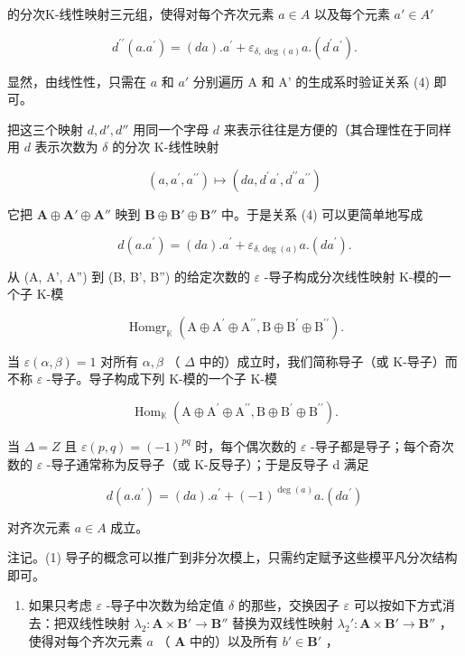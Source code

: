 的分次K-线性映射三元组，使得对每个齐次元素 \(a \in A\) 以及每个元素 \(a' \in A'\)

\[
d ^ {\prime \prime} (a. a ^ {\prime}) = (d a). a ^ {\prime} + \varepsilon_ {\delta , \deg (a)} a. (d ^ {\prime} a ^ {\prime}).\tag{4}
\]

显然，由线性性，只需在 \(a\) 和 \(a'\) 分别遍历 A 和 A' 的生成系时验证关系 (4) 即可。

把这三个映射 \(d, d', d''\) 用同一个字母 \(d\) 来表示往往是方便的（其合理性在于同样用 \(d\) 表示次数为 \(\delta\) 的分次 K-线性映射

\[
(a, a ^ {\prime}, a ^ {\prime \prime}) \mapsto (d a, d ^ {\prime} a ^ {\prime}, d ^ {\prime \prime} a ^ {\prime \prime})
\]

它把 \(\mathbf{A} \oplus \mathbf{A}' \oplus \mathbf{A}''\) 映到 \(\mathbf{B} \oplus \mathbf{B}' \oplus \mathbf{B}''\) 中。于是关系 (4) 可以更简单地写成

\[
d (a. a ^ {\prime}) = (d a). a ^ {\prime} + \varepsilon_ {\delta . \deg (a)} a. (d a ^ {\prime}).\tag{5}
\]

从 (A, A', A'') 到 (B, B', B'') 的给定次数的 \(\varepsilon\) -导子构成分次线性映射 K-模的一个子 K-模

\[
\operatorname{Homgr} _ {\mathbb {K}} (\mathrm{A} \oplus \mathrm{A} ^ {\prime} \oplus \mathrm{A} ^ {\prime \prime}, \mathrm{B} \oplus \mathrm{B} ^ {\prime} \oplus \mathrm{B} ^ {\prime \prime}).
\]

当 \(\varepsilon(\alpha, \beta) = 1\) 对所有 \(\alpha, \beta\) （ \(\Delta\) 中的）成立时，我们简称导子（或 K-导子）而不称 \(\varepsilon\) -导子。导子构成下列 K-模的一个子 K-模

\[
\operatorname{Hom} _ {\mathbb {K}} (\mathrm{A} \oplus \mathrm{A} ^ {\prime} \oplus \mathrm{A} ^ {\prime \prime}, \mathrm{B} \oplus \mathrm{B} ^ {\prime} \oplus \mathrm{B} ^ {\prime \prime}).
\]

当 \(\Delta = Z\) 且 \(\varepsilon(p, q) = (-1)^{pq}\) 时，每个偶次数的 \(\varepsilon\) -导子都是导子；每个奇次数的 \(\varepsilon\) -导子通常称为反导子（或 K-反导子）；于是反导子 d 满足

\[
d (a. a ^ {\prime}) = (d a). a ^ {\prime} + (- 1) ^ {\deg (a)} a. (d a ^ {\prime})\tag{6}
\]

对齐次元素 \(a \in A\) 成立。

注记。(1) 导子的概念可以推广到非分次模上，只需约定赋予这些模平凡分次结构即可。

\begin{enumerate}
\def\labelenumi{(\arabic{enumi})}
\setcounter{enumi}{1}
\tightlist
\item
  如果只考虑 \(\varepsilon\) -导子中次数为给定值 \(\delta\) 的那些，交换因子 \(\varepsilon\) 可以按如下方式消去：把双线性映射 \(\lambda_2: \mathbf{A} \times \mathbf{B}' \to \mathbf{B}''\) 替换为双线性映射 \(\lambda_2': \mathbf{A} \times \mathbf{B}' \to \mathbf{B}''\) ，使得对每个齐次元素 \(a\) （ \(\mathbf{A}\) 中的）以及所有 \(b' \in \mathbf{B}'\) ，
\end{enumerate}


